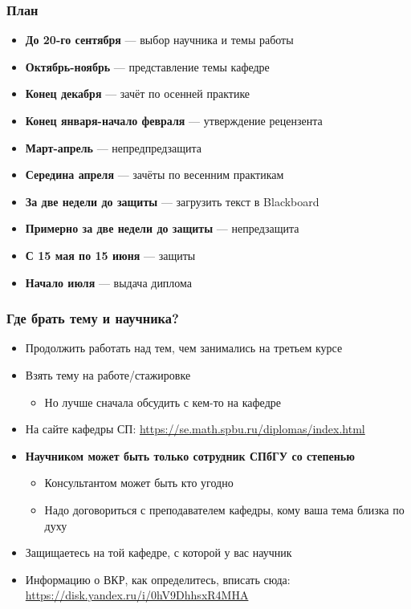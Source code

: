 \documentclass{../../slides-style}
\begin{document}
    \begin{frame}[plain]
        \titlepage
    \end{frame}

    \begin{frame}
        \frametitle{План}
        \begin{itemize}
            \item \textbf{До 20-го сентября} --- выбор научника и темы работы
            \item \textbf{Октябрь-ноябрь} --- представление темы кафедре
            \item \textbf{Конец декабря} --- зачёт по осенней практике
            \item \textbf{Конец января-начало февраля} --- утверждение рецензента
            \item \textbf{Март-апрель} --- непредпредзащита
            \item \textbf{Середина апреля} --- зачёты по весенним практикам
            \item \textbf{За две недели до защиты} --- загрузить текст в Blackboard
            \item \textbf{Примерно за две недели до защиты} --- непредзащита
            \item \textbf{С 15 мая по 15 июня} --- защиты
            \item \textbf{Начало июля} --- выдача диплома
        \end{itemize}
    \end{frame}
    
    \begin{frame}
        \frametitle{Где брать тему и научника?}
        \begin{itemize}
            \item Продолжить работать над тем, чем занимались на третьем курсе
            \item Взять тему на работе/стажировке
            \begin{itemize}
                \item Но лучше сначала обсудить с кем-то на кафедре
            \end{itemize}
            \item На сайте кафедры СП: \url{https://se.math.spbu.ru/diplomas/index.html}
            \item \textbf{Научником может быть только сотрудник СПбГУ со степенью}
            \begin{itemize}
                \item Консультантом может быть кто угодно
                \item Надо договориться с преподавателем кафедры, кому ваша тема близка по духу
            \end{itemize}
            \item Защищаетесь на той кафедре, с которой у вас научник
            \item Информацию о ВКР, как определитесь, вписать сюда: \url{https://disk.yandex.ru/i/0hV9DhhsxR4MHA}
        \end{itemize}
    \end{frame}
\end{document}
